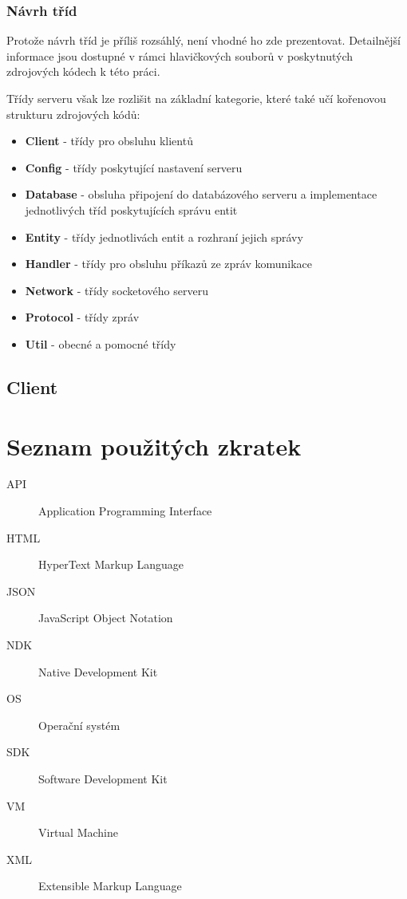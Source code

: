 \documentclass[thesis=B,czech]{FITthesis}[2013/10/20]
\begin{document}
\subsection{Návrh tříd}

Protože návrh tříd je příliš rozsáhlý, není vhodné ho zde prezentovat. Detailnější informace jsou dostupné v rámci hlavičkových souborů v poskytnutých zdrojových kódech k této práci.

Třídy serveru však lze rozlišit na základní kategorie, které také učí kořenovou strukturu zdrojových kódů:

\begin{itemize}
  \item{\textbf{Client} - třídy pro obsluhu klientů}
  \item{\textbf{Config} - třídy poskytující nastavení serveru}
  \item{\textbf{Database} - obsluha připojení do databázového serveru a implementace jednotlivých tříd poskytujících správu entit}
  \item{\textbf{Entity} - třídy jednotlivách entit a rozhraní jejich správy}
  \item{\textbf{Handler} - třídy pro obsluhu příkazů ze zpráv komunikace}
  \item{\textbf{Network} - třídy socketového serveru}
  \item{\textbf{Protocol} - třídy zpráv}
  \item{\textbf{Util} - obecné a pomocné třídy}
\end{itemize}


\section{Client}

\begin{conclusion}
\end{conclusion}




\appendix

\chapter{Seznam použitých zkratek}
\begin{description}
	\item[API] Application Programming Interface
	\item[HTML] HyperText Markup Language
	\item[JSON] JavaScript Object Notation
	\item[NDK] Native Development Kit
	\item[OS] Operační systém
	\item[SDK] Software Development Kit
	\item[VM] Virtual Machine
	\item[XML] Extensible Markup Language
\end{description}
\end{document}
